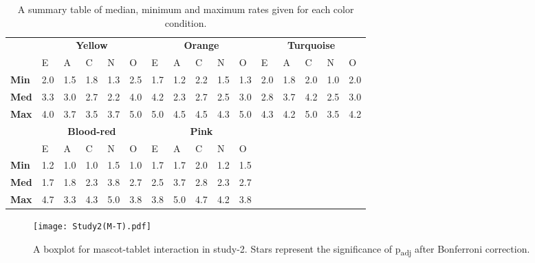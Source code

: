 \begin{table}[H]
    \renewcommand{\arraystretch}{1}
    \begin{center}
        \begin{tabular}{p{}|
        p{}|p{}|p{}|p{}|p{}||
        p{}|p{}|p{}|p{}|p{}||
        p{}|p{}|p{}|p{}|p{}|}
            \cline{2-16}
            & \multicolumn{5}{c||}{\textbf{Yellow}} & \multicolumn{5}{c||}{\textbf{Orange}}
            & \multicolumn{5}{c|}{\textbf{Turquoise}} \\
            \cline{2-16}
            & E & A & C & N & O & E & A & C & N & O & E & A & C & N & O      \\
            \cline{2-16}
            \textbf{Min}    & 2.0 & 1.5 & 1.8 & 1.3 & 2.5 & 1.7 & 1.2 & 2.2 & 1.5 & 1.3 & 2.0 & 1.8 & 2.0 & 1.0 & 2.0  \\
            \textbf{Med}    & 3.3 & 3.0 & 2.7 & 2.2 & 4.0 & 4.2 & 2.3 & 2.7 & 2.5 & 3.0 & 2.8 & 3.7 & 4.2 & 2.5 & 3.0  \\
            \textbf{Max}    & 4.0 & 3.7 & 3.5 & 3.7 & 5.0 & 5.0 & 4.5 & 4.5 & 4.3 & 5.0 & 4.3 & 4.2 & 5.0 & 3.5 & 4.2 \\
            \cline{2-16}
            \cline{2-11}
            &  \multicolumn{5}{|c||}{\textbf{Blood-red}} & \multicolumn{5}{|c||}{\textbf{Pink}} \\
            \cline{2-11}
            & E & A & C & N & O & E & A & C & N & O            \\
            \cline{2-11}
            \textbf{Min}    & 1.2 & 1.0 & 1.0 & 1.5 & 1.0 & 1.7 & 1.7 & 2.0 & 1.2 & 1.5    \\
            \textbf{Med}    & 1.7 & 1.8 & 2.3 & 3.8 & 2.7 & 2.5 & 3.7 & 2.8 & 2.3 & 2.7    \\
            \textbf{Max}    & 4.7 & 3.3 & 4.3 & 5.0 & 3.8 & 3.8 & 5.0 & 4.7 & 4.2 & 3.8    \\
            \cline{2-11}
        \end{tabular}
        \caption[]{A summary table of median, minimum and maximum rates given for each color condition.\footnotemark}
        \label{table:medianMT2}
    \end{center}
\end{table}

\begin{figure}[H]
    \centering
    \texttt{[image: Study2(M-T).pdf]}
    \caption[]{A boxplot for mascot-tablet interaction in study-2.
    Stars represent the significance of p\textsubscript{adj} after Bonferroni correction.\footnotemark}
    \label{fig:MT2}
\end{figure}
